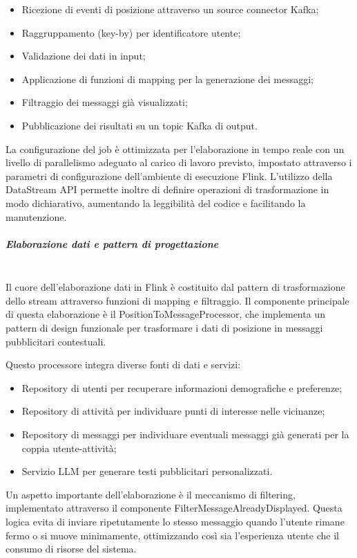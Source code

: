 \documentclass[10pt]{article}
\newcommand{\mysubparagraph}[1]{\subparagraph{#1}\mbox{}\\}
\begin{document}
        \begin{itemize}
            \item Ricezione di eventi di posizione attraverso un source connector Kafka;
            \item Raggruppamento (key-by) per identificatore utente;
            \item Validazione dei dati in input;
            \item Applicazione di funzioni di mapping per la generazione dei messaggi;
            \item Filtraggio dei messaggi già visualizzati;
            \item Pubblicazione dei risultati su un topic Kafka di output.
        \end{itemize}

        La configurazione del job è ottimizzata per l'elaborazione in tempo reale con un livello di parallelismo adeguato al carico di lavoro previsto, impostato attraverso i parametri di configurazione dell'ambiente di esecuzione Flink.
        L'utilizzo della DataStream API permette inoltre di definire operazioni di trasformazione in modo dichiarativo, aumentando la leggibilità del codice e facilitando la manutenzione.

        \mysubparagraph{Elaborazione dati e pattern di progettazione}
        Il cuore dell'elaborazione dati in Flink è costituito dal pattern di trasformazione dello stream attraverso funzioni di mapping e filtraggio.
        Il componente principale di questa elaborazione è il PositionToMessageProcessor, che implementa un pattern di design funzionale per trasformare i dati di posizione in messaggi pubblicitari contestuali.

        Questo processore integra diverse fonti di dati e servizi:
        \begin{itemize}
            \item Repository di utenti per recuperare informazioni demografiche e preferenze;
            \item Repository di attività per individuare punti di interesse nelle vicinanze;
            \item Repository di messaggi per individuare eventuali messaggi già generati per la coppia utente-attività;
            \item Servizio LLM per generare testi pubblicitari personalizzati.
        \end{itemize}

        Un aspetto importante dell'elaborazione è il meccanismo di filtering, implementato attraverso il componente FilterMessageAlreadyDisplayed. Questa logica evita di inviare ripetutamente lo stesso messaggio quando l'utente rimane fermo o si muove minimamente, ottimizzando così sia l'esperienza utente che il consumo di risorse del sistema.
\end{document}
